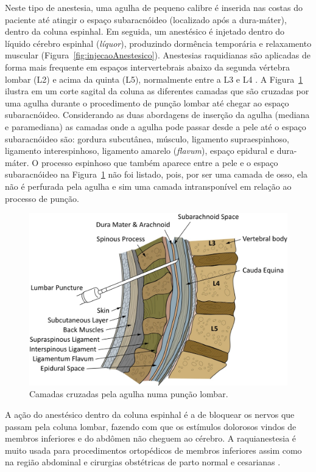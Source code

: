 Neste tipo de anestesia, uma agulha de pequeno calibre é inserida nas costas do paciente até atingir o espaço subaracnóideo (localizado após a dura-máter), dentro da coluna espinhal. Em seguida, um anestésico é injetado dentro do líquido cérebro espinhal (\textit{líquor}), produzindo dormência temporária e relaxamento muscular (Figura~\ref{fig:injecaoAnestesico}). Anestesias raquidianas são aplicadas de forma mais frequente em espaços intervertebrais abaixo da segunda vértebra lombar (L2) e acima da quinta (L5), normalmente entre a L3 e L4 \cite{Wikipedia2019, Londero2018}. A Figura~\ref{fig:camadasPuncaoLombar} ilustra em um corte sagital da coluna as diferentes camadas que são cruzadas por uma agulha durante o procedimento de punção lombar até chegar ao espaço subaracnóideo. Considerando as duas abordagens de inserção da agulha (mediana e paramediana) as camadas onde a agulha pode passar desde a pele até o espaço subaracnóideo são: gordura subcutânea, músculo, ligamento supraespinhoso, ligamento interespinhoso, ligamento amarelo (\textit{flavum}), espaço epidural e dura-máter. O processo espinhoso que também aparece entre a pele e o espaço subaracnóideo na Figura~\ref{fig:camadasPuncaoLombar} não foi listado, pois, por ser uma camada de osso, ela não é perfurada pela agulha e sim uma camada intransponível em relação ao processo de punção.

\begin{figure}[ht!]
    \centering
    \includegraphics[width=0.6\linewidth]{capitulos/figuras/lumbar.puncture.tisssues.jpeg}
    \caption{Camadas cruzadas pela agulha numa punção lombar.}
    \label{fig:camadasPuncaoLombar}
\end{figure}

A ação do anestésico dentro da coluna espinhal é a de bloquear os nervos que passam pela coluna lombar, fazendo com que os estímulos dolorosos vindos de membros inferiores e do abdômen não cheguem ao cérebro. A raquianestesia é muito usada para procedimentos ortopédicos de membros inferiores assim como na região abdominal e cirurgias obstétricas de parto normal e cesarianas \cite{Pinheiro2018}.

